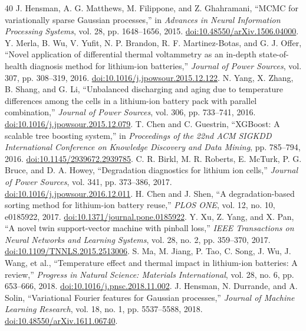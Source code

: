 \begin{thebibliography}{40}
 J. Hensman, A. G. Matthews, M. Filippone, and Z. Ghahramani, ``MCMC for variationally sparse Gaussian processes,'' in \emph{Advances in Neural Information Processing Systems}, vol. 28, pp. 1648--1656, 2015. \href{https://doi.org/10.48550/arXiv.1506.04000}{doi:10.48550/arXiv.1506.04000}.
 Y. Merla, B. Wu, V. Yufit, N. P. Brandon, R. F. Martinez-Botas, and G. J. Offer, ``Novel application of differential thermal voltammetry as an in-depth state-of-health diagnosis method for lithium-ion batteries,'' \emph{Journal of Power Sources}, vol. 307, pp. 308--319, 2016. \href{https://doi.org/10.1016/j.jpowsour.2015.12.122}{doi:10.1016/j.jpowsour.2015.12.122}.
 N. Yang, X. Zhang, B. Shang, and G. Li, ``Unbalanced discharging and aging due to temperature differences among the cells in a lithium-ion battery pack with parallel combination,'' \emph{Journal of Power Sources}, vol. 306, pp. 733--741, 2016. \href{https://doi.org/10.1016/j.jpowsour.2015.12.079}{doi:10.1016/j.jpowsour.2015.12.079}.
 T. Chen and C. Guestrin, ``XGBoost: A scalable tree boosting system,'' in \emph{Proceedings of the 22nd ACM SIGKDD International Conference on Knowledge Discovery and Data Mining}, pp. 785--794, 2016. \href{https://doi.org/10.1145/2939672.2939785}{doi:10.1145/2939672.2939785}.
 C. R. Birkl, M. R. Roberts, E. McTurk, P. G. Bruce, and D. A. Howey, ``Degradation diagnostics for lithium ion cells,'' \emph{Journal of Power Sources}, vol. 341, pp. 373--386, 2017. \href{https://doi.org/10.1016/j.jpowsour.2016.12.011}{doi:10.1016/j.jpowsour.2016.12.011}.
 H. Chen and J. Shen, ``A degradation-based sorting method for lithium-ion battery reuse,'' \emph{PLOS ONE}, vol. 12, no. 10, e0185922, 2017. \href{https://doi.org/10.1371/journal.pone.0185922}{doi:10.1371/journal.pone.0185922}.
 Y. Xu, Z. Yang, and X. Pan, ``A novel twin support-vector machine with pinball loss,'' \emph{IEEE Transactions on Neural Networks and Learning Systems}, vol. 28, no. 2, pp. 359--370, 2017. \href{https://doi.org/10.1109/TNNLS.2015.2513006}{doi:10.1109/TNNLS.2015.2513006}.
 S. Ma, M. Jiang, P. Tao, C. Song, J. Wu, J. Wang, et al., ``Temperature effect and thermal impact in lithium-ion batteries: A review,'' \emph{Progress in Natural Science: Materials International}, vol. 28, no. 6, pp. 653--666, 2018. \href{https://doi.org/10.1016/j.pnsc.2018.11.002}{doi:10.1016/j.pnsc.2018.11.002}.
 J. Hensman, N. Durrande, and A. Solin, ``Variational Fourier features for Gaussian processes,'' \emph{Journal of Machine Learning Research}, vol. 18, no. 1, pp. 5537--5588, 2018. \href{https://doi.org/10.48550/arXiv.1611.06740}{doi:10.48550/arXiv.1611.06740}.

\end{thebibliography}
